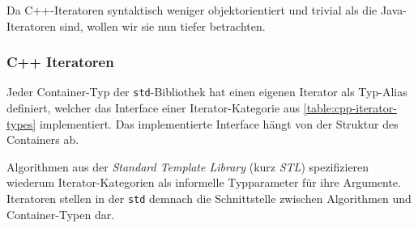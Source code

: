 \documentclass[runningheads]{llncs}
\begin{document}

Da C++-Iteratoren syntaktisch weniger objektorientiert und trivial als die Java-Iteratoren sind, wollen wir sie nun tiefer betrachten.

\subsubsection{C++ Iteratoren}

Jeder Container-Typ der \texttt{std}-Bibliothek hat einen eigenen Iterator als Typ-Alias definiert, welcher das Interface einer Iterator-Kategorie aus \autoref{table:cpp-iterator-types} implementiert.
Das implementierte Interface hängt von der Struktur des Containers ab.

Algorithmen aus der \textit{Standard Template Library} (kurz \textit{STL}) spezifizieren wiederum Iterator-Kategorien als informelle Typparameter für ihre Argumente.
Iteratoren stellen in der \texttt{std} demnach die Schnittstelle zwischen Algorithmen und Container-Typen dar.
\end{document}
